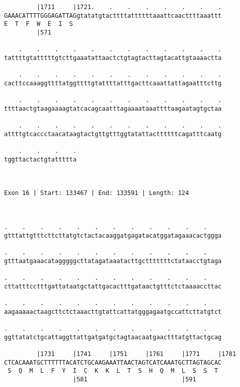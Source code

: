 \documentclass{article}
\begin{document}
\begin{Verbatim}
         |1711     |1721.    .    .    .    .    .    .    .
GAAACATTTTGGGAGATTAGgtatatgtacttttattttttaaattcaacttttaaattt
E  T  F  W  E  I  S                                         
         |571                                               
  
    .    .    .    .    .    .    .    .    .    .    .    .
tattttgtatttttgtcttgaaatattaactctgtagtacttagtacattgtaaaactta
                                                            
    .    .    .    .    .    .    .    .    .    .    .    .
cacttccaaaggttttatggttttgtattttatttgacttcaaattattagaatttcttg
                                                            
    .    .    .    .    .    .    .    .    .    .    .    .
ttttaactgtaagaaaagtatcacagcaatttagaaaataaattttaagaatagtgctaa
                                                            
    .    .    .    .    .    .    .    .    .    .    .    .
attttgtcaccctaacataagtactgttgtttggtatattacttttttcagatttcaatg
                                                            
    .    .    .    .
tggttactactgtattttta
                    
                    
 
Exon 16 | Start: 133467 | End: 133591 | Length: 124



.    .    .    .    .    .    .    .    .    .    .    .    
gtttattgtttcttcttatgtctactacaaggatgagatacatggatagaaacactggga
                                                            
.    .    .    .    .    .    .    .    .    .    .    .    
gtttaatgaaacatagggggcttatagataaatacttgctttttttctataacctgtaga
                                                            
.    .    .    .    .    .    .    .    .    .    .    .    
cttatttcctttgattataatgctattgacactttgataactgtttctctaaaaccttac
                                                            
.    .    .    .    .    .    .    .    .    .    .    .    
aagaaaaactaagcttctctaaacttgtattcattatgggagaatgccattcttatgtct
                                                            
.    .    .    .    .    .    .    .    .    .    .    .    
ggttatatctgcattaggttattgatgatgctagtaacaatgaactttatgttactgcag
                                                            
         |1731     |1741     |1751     |1761     |1771     |1781
CTCACAAATGCTTTTTTACATCTGCAAGAAATTAACTAGTCATCAAATGCTTAGTAGCAC
 S  Q  M  L  F  Y  I  C  K  K  L  T  S  H  Q  M  L  S  S  T 
                   |581                          |591       
  

\end{Verbatim}
\end{document}
